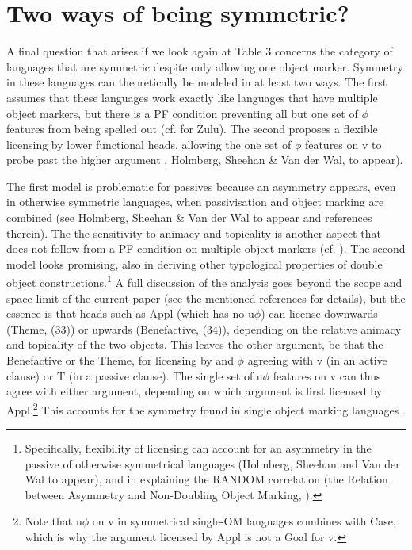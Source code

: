 \documentclass[output=paper
,modfonts
,nonflat]{langsci/langscibook}
\begin{document}
\section{Two ways of being symmetric?}

A final question that arises if we look again at Table 3 concerns the category of languages that are symmetric despite only allowing one object marker. Symmetry in these languages can theoretically be modeled in at least two ways. The first assumes that these languages work exactly like languages that have multiple object markers, but there is a PF condition preventing all but one set of $\phi$ features from being spelled out (cf. \citealt{Adams2010} for Zulu). The second proposes a flexible licensing by lower functional heads, allowing the one set of $\phi$ features on v to probe past the higher argument \citep{Haddican_Holmberg2012, Haddican_Holmberg2015,Van_der_Wal2017a}, Holmberg, Sheehan \& Van der Wal, to appear). 

The first model is problematic for passives because an asymmetry appears, even in otherwise symmetric languages, when passivisation and object marking are combined (see Holmberg, Sheehan \& Van der Wal to appear and references therein). The the sensitivity to animacy and topicality is another aspect that does not follow from a PF condition on multiple object markers (cf. \citealt{Zeller2012}). The second model looks promising, also in deriving other typological properties of double object constructions.\footnote{Specifically, flexibility of licensing can account for an asymmetry in the passive of otherwise symmetrical languages (Holmberg, Sheehan and Van der Wal to appear), and in explaining the RANDOM correlation (the Relation between Asymmetry and Non-Doubling Object Marking, \citealt{Van_der_Wal2017b}).} A full discussion of the analysis goes beyond the scope and space-limit of the current paper (see the mentioned references for details), but the essence is that heads such as Appl (which has no u$\phi$) can license downwards (Theme, (33)) or upwards (Benefactive, (34)), depending on the relative animacy and topicality of the two objects. This leaves the other argument, be that the Benefactive or the Theme, for licensing by and $\phi$ agreeing with v (in an active clause) or T (in a passive clause). The single set of u$\phi$ features on v can thus agree with either argument, depending on which argument is first licensed by Appl.\footnote{Note that u$\phi$ on v in symmetrical single-OM languages combines with Case, which is why the argument licensed by Appl is not a Goal for v.} This accounts for the symmetry found in single object marking languages \citep{Van_der_Wal2017a}.
\end{document}
